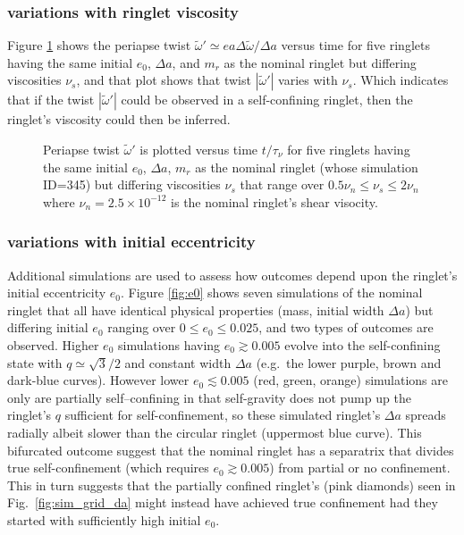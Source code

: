 \documentclass[preprint]{aastex62}
\begin{document}
\subsubsection{variations with ringlet viscosity}
\label{subsec:viscosity-variations}

Figure \ref{fig:wt_prime_vs_time} shows the periapse twist $\tilde{\omega}' \simeq ea\Delta\tilde{\omega}/\Delta a$ 
versus time for five ringlets
having the same initial $e_0$, $\Delta a$, and $m_r$ as the nominal ringlet but differing viscosities $\nu_s$, and
that plot shows that twist $|\tilde{\omega}'|$ varies with $\nu_s$. Which indicates that if 
the twist $|\tilde{\omega}'|$ could be observed in a self-confining ringlet, then 
the ringlet's viscosity could then be inferred. 

\begin{figure}
    \caption{
        \label{fig:wt_prime_vs_time}
        Periapse twist $\tilde{\omega}'$ is plotted versus time $t/\tau_\nu$ for five ringlets
        having the same initial $e_0$, $\Delta a$, $m_r$ as the nominal ringlet (whose simulation ID=345)
        but differing viscosities $\nu_s$ that range over $0.5\nu_n\le\nu_s\le2\nu_n$
        where $\nu_n=2.5\times10^{-12}$ is the nominal ringlet's shear visocity.
    }
\end{figure}

\subsubsection{variations with initial eccentricity}
\label{subsec:e-variations}

Additional simulations are used to assess how outcomes depend upon the ringlet's initial eccentricity $e_0$.
Figure \ref{fig:e0} shows seven simulations of the nominal ringlet that all have identical
physical properties (mass, initial width $\Delta a$) but differing initial $e_0$ ranging
over $0\le e_0\le 0.025$, and two types of outcomes are observed. Higher $e_0$ simulations having $e_0\gtrsim0.005$ 
evolve into the self-confining state with $q\simeq\sqrt{3}/2$ and constant width $\Delta a$
(e.g.\ the lower purple, brown and dark-blue curves). However 
lower $e_0\lesssim0.005$ (red, green, orange) simulations are only 
are partially self--confining in that self-gravity does not pump up the ringlet's $q$
sufficient for self-confinement, so these simulated ringlet's $\Delta a$ spreads radially
albeit slower than the circular ringlet (uppermost blue curve).
This bifurcated outcome suggest that the nominal ringlet has a
separatrix that divides true self-confinement (which requires $e_0\gtrsim0.005$) from partial or no
confinement. This in turn suggests that the partially confined ringlet's (pink diamonds) seen in
Fig.\ \ref{fig:sim_grid_da} might instead have achieved 
true confinement had they started with sufficiently high initial $e_0$.
\end{document}
